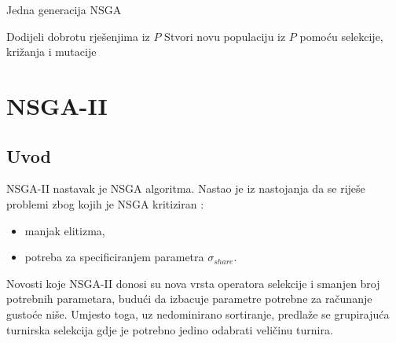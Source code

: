 \documentclass[times, utf8, zavrsni, numeric]{fer}
\begin{document}
\begin{algorithm}
\caption{Jedna generacija NSGA}
\label{algo:nsga-one-gen}
\begin{algorithmic}
\STATE Dodijeli dobrotu rješenjima iz $P$
\STATE Stvori novu populaciju iz $P$ pomoću selekcije, križanja i mutacije
\end{algorithmic}
\end{algorithm}

\section{NSGA-II}
\subsection{Uvod}
NSGA-II nastavak je NSGA algoritma. Nastao je iz nastojanja da se riješe problemi zbog kojih je NSGA kritiziran \citep{nsga2}:
\begin{itemize}
\item manjak elitizma,
\item potreba za specificiranjem parametra $\sigma_{share}$.
\end{itemize}
Novosti koje NSGA-II donosi su nova vrsta operatora selekcije i smanjen broj potrebnih parametara, budući da izbacuje parametre potrebne za računanje gustoće niše. Umjesto toga, uz nedominirano sortiranje, predlaže se grupirajuća turnirska selekcija gdje je potrebno jedino odabrati veličinu turnira.
\end{document}
